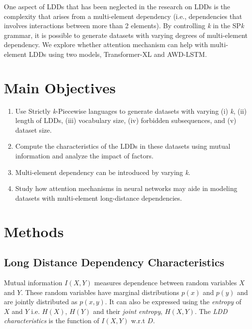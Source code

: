 \documentclass[a0,portrait]{a0poster}
\begin{document}
\begin{multicols}{2}
One aspect of LDDs that has been neglected in the research on LDDs is the complexity that arises from a multi-element dependency (i.e., dependencies that involves interactions between more than 2 elements). By controlling \emph{k} in the SP\emph{k} grammar, it is possible to generate datasets with varying degrees of multi-element dependency. We explore whether attention mechanism can help with multi-element LDDs using two models, Transformer-XL and AWD-LSTM.


\color{tudLogoColor}

\section*{Main Objectives}

\color{black}
\begin{enumerate}
\item Use Strictly \emph{k}-Piecewise languages to generate datasets with varying (i) \emph{k}, (ii) length of LDDs, (iii) vocabulary size, (iv) forbidden subsequences, and (v) dataset size.
\item Compute the characteristics of the LDDs in these datasets using mutual information and analyze the impact of factors.
\item Multi-element dependency can be introduced by varying \emph{k}. 
\item Study how attention mechanisms in neural networks may aide in modeling datasets with multi-element long-distance dependencies.
\end{enumerate}


\section*{Methods}

\subsection*{Long Distance Dependency Characteristics}

Mutual information $I(X,Y)$ measures dependence between random variables $X$ and $Y$. These random variables have marginal distributions $p(x)$ and $p(y)$ and are jointly distributed as $p(x,y)$. It can also be expressed using the \emph{entropy} of $X$ and $Y$ i.e. $H(X)$, $H(Y)$ and their \emph{joint entropy}, $H(X,Y)$. The \emph{LDD characteristics} is the function of $I(X,Y)$ w.r.t $D$.


\end{multicols}
\end{document}
